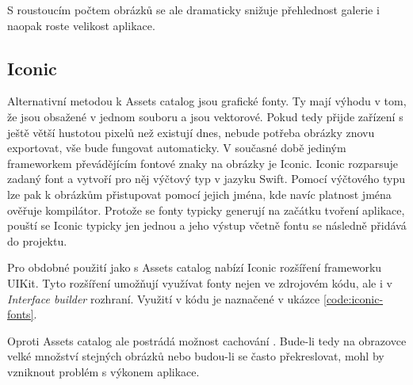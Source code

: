 S roustoucím počtem obrázků se ale dramaticky snižuje přehlednost galerie i naopak roste velikost aplikace.

\subsection{Iconic}

Alternativní metodou k Assets catalog jsou grafické fonty.
Ty mají výhodu v tom, že jsou obsažené v jednom souboru a jsou vektorové.
Pokud tedy přijde zařízení s ještě větší hustotou pixelů než existují dnes, nebude potřeba obrázky znovu exportovat, vše bude fungovat automaticky.
V současné době jediným frameworkem převádějícím fontové znaky na obrázky je Iconic.
Iconic rozparsuje zadaný font a vytvoří pro něj výčtový typ v jazyku Swift.
Pomocí výčtového typu lze pak k obrázkům přistupovat pomocí jejich jména, kde navíc platnost jména ověřuje kompilátor.
Protože se fonty typicky generují na začátku tvoření aplikace, pouští se Iconic typicky jen jednou a jeho výstup včetně fontu se následně přidává do projektu.

Pro obdobné použití jako s Assets catalog nabízí Iconic rozšíření frameworku UIKit.
Tyto rozšíření umožňují využívat fonty nejen ve zdrojovém kódu, ale i v \textit{Interface builder} rozhraní.
Využití v kódu je naznačené v ukázce \ref{code:iconic-fonts}.


Oproti Assets catalog ale postrádá možnost cachování \cite{github-iconic-cache}.
Bude-li tedy na obrazovce velké množství stejných obrázků nebo budou-li se často překreslovat, mohl by vzniknout problém s výkonem aplikace.




